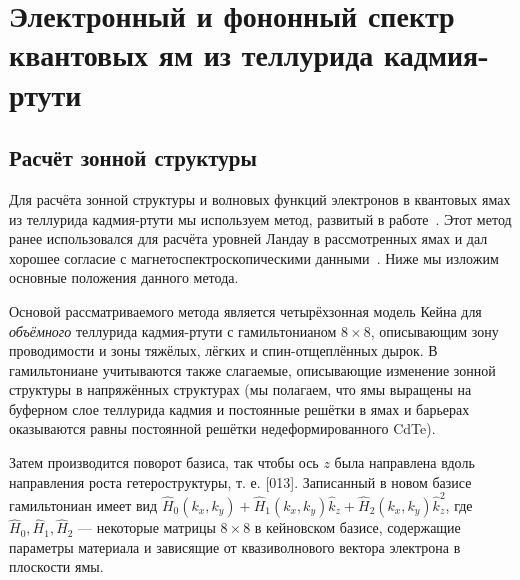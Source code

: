 \section{Электронный и фононный спектр квантовых ям из теллурида кадмия-ртути} \label{sec:HgCdTe-basics}
\subsection{Расчёт зонной структуры} \label{sec:HgCdTe-Kane}
Для расчёта зонной структуры и волновых функций электронов в квантовых ямах из теллурида кадмия-ртути мы используем метод, развитый в работе~\cite{Kane_model}. Этот метод ранее использовался для расчёта уровней Ландау в рассмотренных ямах и дал хорошее согласие с магнетоспектроскопическими данными~\cite{Kane_model}.  Ниже мы изложим основные положения данного метода.

Основой рассматриваемого метода является четырёхзонная модель Кейна для \emph{объёмного} теллурида кадмия-ртути с гамильтонианом $8 \times 8$, описывающим зону проводимости и зоны тяжёлых, лёгких и спин-отщеплённых дырок. В гамильтониане учитываются также слагаемые, описывающие изменение зонной структуры в напряжённых структурах (мы полагаем, что ямы выращены на буферном слое теллурида кадмия и постоянные решётки в ямах и барьерах оказываются равны постоянной решётки недеформированного CdTe).

Затем производится поворот базиса, так чтобы ось $z$ была направлена вдоль направления роста гетероструктуры, т. е. [013]. Записанный в новом базисе гамильтониан имеет вид ${\hat H}_0(k_x,k_y) + {\hat H}_1(k_x,k_y) {\hat k}_z + {\hat H}_2(k_x,k_y) {\hat k}_z^2$, где ${\hat H}_0, {\hat H}_1, {\hat H}_2$ --- некоторые матрицы $8 \times 8$ в кейновском базисе, содержащие параметры материала и зависящие от квазиволнового вектора электрона в плоскости ямы.

